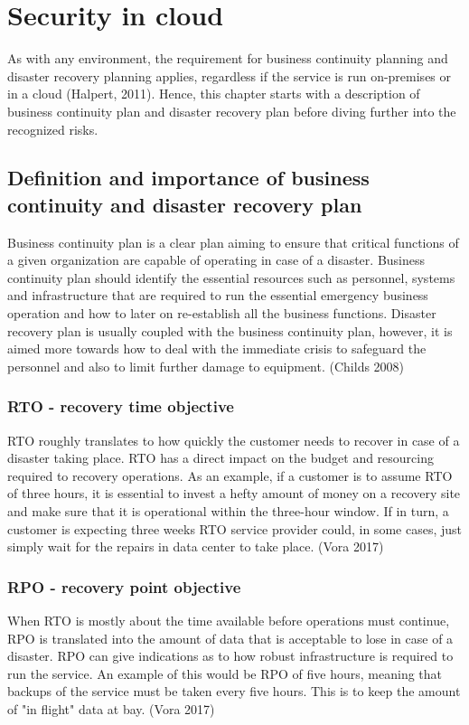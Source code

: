 \documentclass{article}
\begin{document}
\section{Security in cloud}
As with any environment, the requirement for business continuity planning and disaster recovery planning applies, regardless if the service is run on-premises or in a cloud (Halpert, 2011).
Hence, this chapter starts with a description of business continuity plan and disaster recovery plan before diving further into the recognized risks.
\subsection{Definition and importance of business continuity and disaster recovery plan}
Business continuity plan is a clear plan aiming to ensure that critical functions of a given organization are capable of operating in case of a disaster.
Business continuity plan should identify the essential resources such as personnel, systems and infrastructure that are required to run the essential emergency business operation and how to later on re-establish all the business functions.
Disaster recovery plan is usually coupled with the business continuity plan, however, it is aimed more towards how to deal with the immediate crisis to safeguard the personnel and also to limit further damage to equipment. (Childs 2008)
\subsubsection{RTO - recovery time objective}
RTO roughly translates to how quickly the customer needs to recover in case of a disaster taking place. RTO has a direct impact on the budget and resourcing required to recovery operations. As an example, if a customer is to assume RTO of three hours, it is essential to invest a hefty amount of money on a recovery site and make sure that it is operational within the three-hour window. If in turn, a customer is expecting three weeks RTO service provider could, in some cases, just simply wait for the repairs in data center to take place. (Vora 2017)
\subsubsection{RPO - recovery point objective}
When RTO is mostly about the time available before operations must continue, RPO is translated into the amount of data that is acceptable to lose in case of a disaster. RPO can give indications as to how robust infrastructure is required to run the service. An example of this would be RPO of five hours, meaning that backups of the service must be taken every five hours. This is to keep the amount of "in flight" data at bay. (Vora 2017)
\end{document}
